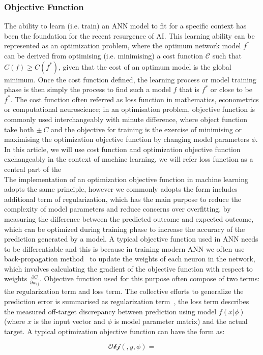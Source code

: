 \subsubsection{Objective Function}
The ability to learn (i.e. train) an ANN model to fit for a specific context has been the foundation for the recent resurgence of AI. This learning ability can be represented as an optimization problem, where the optimum network model $f^*$ can be derived from optimising (i.e. minimising) a cost function $\mathcal{C}$ such that $C(f) \geq C(f^*)$, given that the cost of an optimum model is the global minimum. Once the cost function defined, the learning process or model training phase is then simply the process to find such a model $f$ that is $f^*$ or close to be $f^*$. The cost function often referred as loss function in mathematics, econometrics or computational neuroscience; in an optimisation problem, objective function is commonly used interchangeably with minute difference, where object function take both $\pm~C$ and the objective for training is the exercise of minimising or maximising the optimization objective function by changing model parameters $\phi$. In this article, we will use cost function and optimization objective function exchangeably in the context of machine learning, we will refer loss function as a central part of the 
\\
The implementation of an optimization objective function in machine learning adopts the same principle, however we commonly adopts the form includes additional term of regularization, which has the main purpose to reduce the complexity of model parameters and reduce concerns over overfitting.   by measuring the difference between the predicted outcome and expected outcome, which can be optimized during training phase to increase the accuracy of the prediction generated by a model. A typical objective function used in ANN needs to be differentiable and this is because in training modern ANN we often use back-propagation method~\cite{LeCun_2015,Heaton_2017} to update the weights of each neuron in the network, which involves calculating the gradient of the objective function with respect to weights $\frac {\partial{C}} {\partial{w_{ij}}} $. Objective function used for this purpose often compose of two terms: the regularization term and loss term. The collective efforts to generalize the prediction error is summarised as regularization term~\cite{goodfellow_2015}, the loss term describes the measured off-target discrepancy between prediction using model $f(x|\phi)$ (where $x$ is the input vector and $\phi$ is model parameter matrix) and the actual target. A typical optimization objective function can have the form as:

\begin{equation}
    \mathcal{Obj}(,y,\phi) = 
\end{equation}